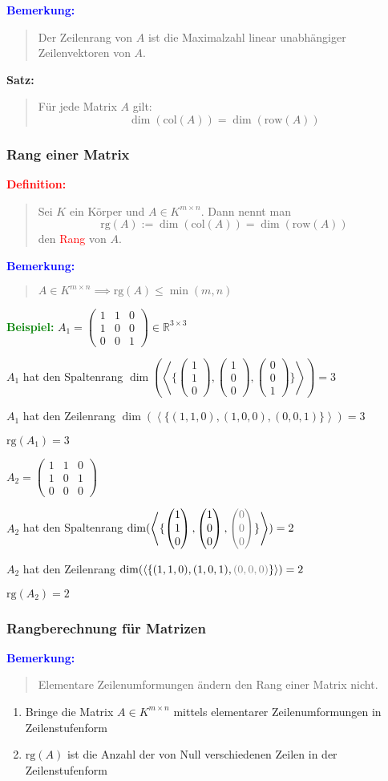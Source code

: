 \documentclass{article}
\newcommand{\red}[1]{\textcolor{red}{#1}}
\newcommand{\gray}[1]{\textcolor{gray}{#1}}
\newcommand{\blue}[1]{\textcolor{blue}{#1}}
\newcommand{\green}[1]{\textcolor{green}{#1}}
\newcommand{\dgr}[1]{\textcolor{dgr}{#1}}
\newcommand{\ex}{\green{\textbf{Beispiel: }}}
\newcommand{\de}[1]{\red{\textbf{Definition: }}\begin{quote}#1\end{quote}}
\newcommand{\an}[1]{\blue{\textbf{Bemerkung: }}\begin{quote}#1\end{quote}}
\newcommand{\se}[1]{\dgr{\textbf{Satz: }}\begin{quote}#1\end{quote}}
\newcommand{\R}{\mathbb{R}}
\newcommand{\vvvec}[3]{\begin{pmatrix}#1\\#2\\#3\end{pmatrix}}
\newcommand{\spann}[1]{\left\langle#1\right\rangle}
\newcommand{\col}{\text{col}}
\newcommand{\row}{\text{row}}
\newcommand{\rg}{\text{rg}}
\begin{document}
\an{
    Der Zeilenrang von $A$ ist die Maximalzahl linear unabhängiger\\
    Zeilenvektoren von $A$.
}

\se{
    Für jede Matrix $A$ gilt:
    \[
        \dim(\col(A)) = \dim(\row(A)) 
    \]
}

\subsubsection{Rang einer Matrix}

\de{
    Sei $K$ ein Körper und $A \in K^{m \times n}$. Dann nennt man
    \[
        \rg(A) := \dim(\col(A)) = \dim(\row(A)) 
    \]
    den \red{Rang} von $A$.
}

\an{
    $A \in K^{m \times n} \implies \rg(A) \leq \min(m,n)$
}

\ex $A_1 =\begin{pmatrix}
    1 & 1 & 0\\
    1 & 0 & 0\\
    0 & 0 & 1
\end{pmatrix} \in \R^{3 \times 3}$

$A_1$ hat den Spaltenrang $\dim(\spann{\{\vvvec{1}{1}{0},\vvvec{1}{0}{0},\vvvec{0}{0}{1}\}}) = 3$

$A_1$ hat den Zeilenrang $\dim(\spann{\{(1,1,0),(1,0,0),(0,0,1)\}}) = 3$

$\rg(A_1) = 3$

\newpage
$A_2 = \begin{pmatrix}
    1 & 1 & 0\\
    1 & 0 & 1\\
    0 & 0 & 0 
\end{pmatrix}$

$A_2$ hat den Spaltenrang $\dim(\spann{\{\vvvec{1}{1}{0},\vvvec{1}{0}{0},\gray{\vvvec{0}{0}{0}}\}}) = 2$

$A_2$ hat den Zeilenrang $\dim(\spann{\{(1,1,0),(1,0,1),\gray{(0,0,0)}\}}) = 2$

$\rg(A_2) = 2$

\subsubsection{Rangberechnung für Matrizen}

\an{
    Elementare Zeilenumformungen ändern den Rang einer Matrix nicht.
}

\begin{enumerate}
    \item Bringe die Matrix $A \in K^{m \times n}$ mittels elementarer Zeilenumformungen in Zeilenstufenform
    \item $\rg(A)$ ist die Anzahl der von Null verschiedenen Zeilen in der Zeilenstufenform
\end{enumerate}
\end{document}
